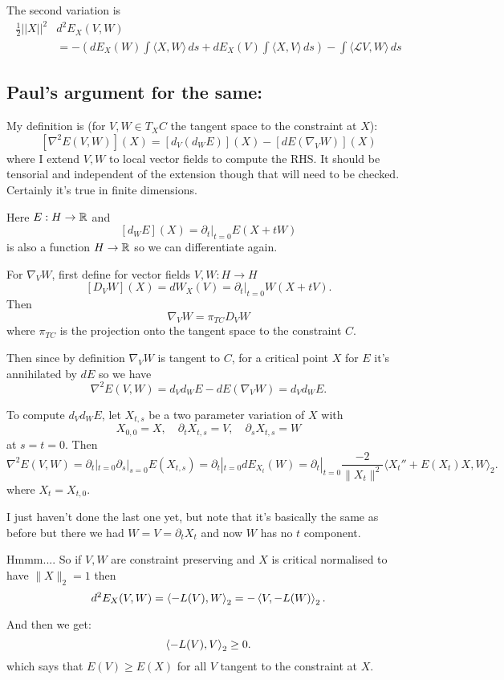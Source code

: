 
\begin{lem} \label{second variation lemma} The second variation is
\begin{align*}\frac12    ||X||^2  &  d^2 E_X(V,W)     \\
&= - \left( dE_X(W)\int \langle X,W \rangle \,ds + dE_X(V)\int \langle X,V \rangle \,ds \right)
-  \int \langle \mathcal{L} V, W \rangle  \,ds\end{align*}
\end{lem}


\subsection*{Paul's argument for the same:} 
 My definition is (for \(V, W \in T_X C\) the tangent space to the constraint at \(X\)):
\[
[\nabla^2 E (V, W)] (X) = [d_V (d_W E)] (X) - [dE(\nabla_V W)](X)
\]
where I extend \(V, W\) to local vector fields to compute the RHS. It should be tensorial and independent of the extension though that will need to be checked. Certainly it's true in finite dimensions.

Here $E : H \to \operatorname{\mathbb{R}}$ and
\[
[d_W E] (X) = \partial_t|_{t=0} E(X + t W)
\]
is also a function $H \to \operatorname{\mathbb{R}}$ so we can differentiate again.

For \(\nabla_V W\), first define for vector fields \(V, W : H \to H\)
\[
[D_V W] (X) = dW_X(V) = \partial_t|_{t=0} W(X + t V).
\]
Then
\[
\nabla_V W = \pi_{TC} D_V W
\]
where \(\pi_{TC}\) is the projection onto the tangent space to the constraint \(C\).

Then since by definition \(\nabla_V W\) is tangent to \(C\), for a critical point \(X\) for \(E\) it's annihilated by \(dE\) so we have
\[
\nabla^2 E(V, W) = d_V d_W E - dE(\nabla_V W) = d_V d_W E. 
\]

To compute \(d_V d_W E\), let \(X_{t,s}\) be a two parameter variation of \(X\) with
\[
X_{0,0} = X, \quad \partial_t X_{t,s} = V, \quad \partial_s X_{t,s} = W
\]
at \(s = t = 0\). Then
\[
\nabla^2 E(V, W) = \partial_t|_{t=0} \partial_s|_{s=0} E(X_{t,s}) = \partial_t|_{t=0} dE_{X_t} (W) = \partial_t|_{t=0} \frac{-2}{\|X_t\|^2} \langle X_t'' + E(X_t) X, W \rangle_2.
\]
where \(X_t = X_{t,0}\).

I just haven't done the last one yet, but note that it's basically the same as before but there we had \(W = V = \partial_t X_t\) and now \(W\) has no \(t\) component.


Hmmm.... So if $V, W$ are constraint preserving and $X$ is critical normalised to have $\|X\|_2 = 1$ then
\[
d^2 E_X (V, W) = \left\langle{-L(V)},{W}\right\rangle_2 = -\left\langle{V},{-L(W)}\right\rangle_2.
\]

And then we get:
\[
\left\langle{-L(V)},{V}\right\rangle_2 \geq 0.
\]
which says that $E(V) \geq E(X)$ for all $V$ tangent to the constraint at $X$.



